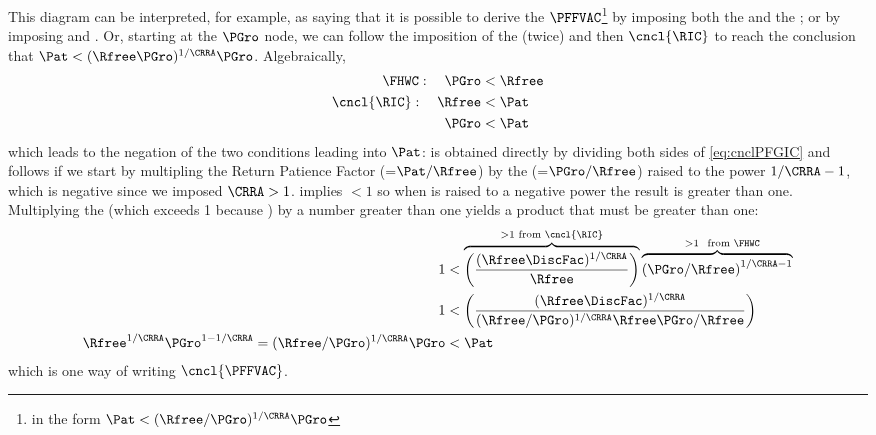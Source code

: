 \documentclass[\econtexRoot/BufferStockTheory]{subfiles}
\begin{document}
This diagram can be interpreted, for example, as saying  that it is possible to derive the $\PFFVAC$\footnote{in the form $\Pat < (\Rfree/\PGro)^{1/\CRRA}\PGro$} by imposing both the {\PFGIC} and the {\FHWC}; or by imposing {\RIC} and \cncl{\FHWC}.  Or, starting at the $\PGro$ node, we can follow the imposition of the {\FHWC} (twice) and then $\cncl{\RIC}$ to reach the conclusion that $\Pat < (\Rfree \PGro)^{1/\CRRA} \PGro$.  Algebraically,
\begin{align}
  {\FHWC}:~~~ \PGro & < \Rfree \notag
  \\ \cncl{\RIC}:~~~ \Rfree & < \Pat \notag
  \\ \PGro & < \Pat \label{eq:cnclPFGIC}
\end{align}
which leads to the negation of the two conditions leading into $\Pat$: \cncl{\PFGIC} is obtained directly by dividing both sides of \eqref{eq:cnclPFGIC} and \cncl{\PFFVAC} follows if we start by multipling the Return Patience Factor ({\RPF}=$\Pat/\Rfree$) by the \FHWF (=$\PGro/\Rfree$) raised to the power $1/\CRRA-1$, which is negative since we imposed $\CRRA > 1$.  {\FHWC} implies {\FHWF} $< 1$ so when {\FHWF} is raised to a negative power the result is greater than one.
Multiplying the \RPF (which exceeds 1 because \cncl{\RIC}) by a number greater than one yields a product that must be greater than one:
\begin{align}
  1  & < \overbrace{\left(\frac{(\Rfree \DiscFac)^{1/\CRRA}}{\Rfree}\right)}^{>1 \text{~from~}\cncl{\RIC}}\overbrace{\left(\PGro/\Rfree\right)^{1/\CRRA-1}}^{\phantom{...}>1~\text{~from~} \FHWC} \notag
  \\ 1  & < \left(\frac{(\Rfree \DiscFac)^{1/\CRRA}}{(\Rfree/\PGro)^{1/\CRRA}\Rfree\PGro/\Rfree}\right) \label{eq:cnclFHWFAndcnclRICImplycnclPFFVAC}
  \\ \Rfree^{1/\CRRA}\PGro^{1 - 1/\CRRA} = (\Rfree/\PGro)^{1/\CRRA} \PGro  & < \Pat \notag
\end{align}
which is one way of writing $\cncl{\PFFVAC}$.
\end{document}
